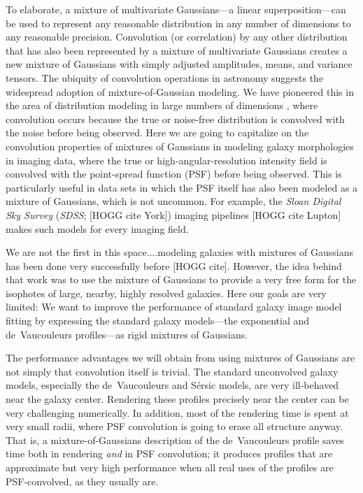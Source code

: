 \documentclass[12pt,pdftex,preprint]{aastex}
\newcommand{\project}[1]{\textsl{#1}}
\newcommand{\sdss}{\project{SDSS}}
\begin{document}
To elaborate, a mixture of multivariate Gaussians---a linear
superposition---can be used to represent any reasonable distribution
in any number of dimensions to any reasonable precision.  Convolution
(or correlation) by any other distribution that has also been
represented by a mixture of multivariate Gaussians creates a new
mixture of Gaussians with simply adjusted amplitudes, means, and
variance tensors.  The ubiquity of convolution operations in astronomy
suggests the widespread adoption of mixture-of-Gaussian modeling.  We
have pioneered this in the area of distribution modeling in large
numbers of dimensions \citep{xd, xdqso, xdqsoz}, where convolution
occurs because the true or noise-free distribution is convolved with
the noise before being observed.  Here we are going to capitalize on
the convolution properties of mixtures of Gaussians in modeling galaxy
morphologies in imaging data, where the true or
high-angular-resolution intensity field is convolved with the
point-spread function (PSF) before being observed.  This is
particularly useful in data sets in which the PSF itself has also been
modeled as a mixture of Gaussians, which is not uncommon.  For
example, the \project{Sloan Digital Sky Survey} (\sdss; [HOGG cite
  York]) imaging pipelines [HOGG cite Lupton] makes such models for
every imaging field.

We are not the first in this space....modeling galaxies with mixtures
of Gaussians has been done very successfully before [HOGG cite].
However, the idea behind that work was to use the mixture of Gaussians
to provide a very free form for the isophotes of large, nearby, highly
resolved galaxies.  Here our goals are very limited: We want to
improve the performance of standard galaxy image model fitting by
expressing the standard galaxy models---the exponential and
de~Vaucouleurs profiles---as rigid mixtures of Gaussians.

The performance advantages we will obtain from using mixtures of
Gaussians are not simply that convolution itself is trivial.  The
standard unconvolved galaxy models, especially the de~Vaucouleurs and
S\'ersic models, are very ill-behaved near the galaxy center.
Rendering these profiles precisely near the center can be very
challenging numerically.  In addition, most of the rendering time is
spent at very small radii, where PSF convolution is going to erase all
structure anyway.  That is, a mixture-of-Gaussians description of the
de~Vaucouleurs profile saves time both in rendering \emph{and} in PSF
convolution; it produces profiles that are approximate but very high
performance when all real uses of the profiles are PSF-convolved, as
they usually are.
\end{document}
